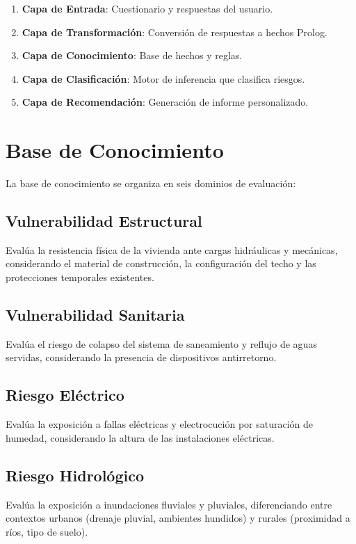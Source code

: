 \documentclass[12pt, letterpaper]{article}
\begin{document}
\begin{enumerate}
  \item \textbf{Capa de Entrada}: Cuestionario y respuestas del usuario.
  \item \textbf{Capa de Transformación}: Conversión de respuestas a hechos Prolog.
  \item \textbf{Capa de Conocimiento}: Base de hechos y reglas.
  \item \textbf{Capa de Clasificación}: Motor de inferencia que clasifica riesgos.
  \item \textbf{Capa de Recomendación}: Generación de informe personalizado.
\end{enumerate}

\clearpage

\section{Base de Conocimiento}

La base de conocimiento se organiza en seis dominios de evaluación:

\subsection{Vulnerabilidad Estructural}
Evalúa la resistencia física de la vivienda ante cargas hidráulicas y mecánicas, considerando el material de construcción, la configuración del techo y las protecciones temporales existentes.

\subsection{Vulnerabilidad Sanitaria}
Evalúa el riesgo de colapso del sistema de saneamiento y reflujo de aguas servidas, considerando la presencia de dispositivos antirretorno.

\subsection{Riesgo Eléctrico}
Evalúa la exposición a fallas eléctricas y electrocución por saturación de humedad, considerando la altura de las instalaciones eléctricas.

\subsection{Riesgo Hidrológico}
Evalúa la exposición a inundaciones fluviales y pluviales, diferenciando entre contextos urbanos (drenaje pluvial, ambientes hundidos) y rurales (proximidad a ríos, tipo de suelo).
\end{document}

